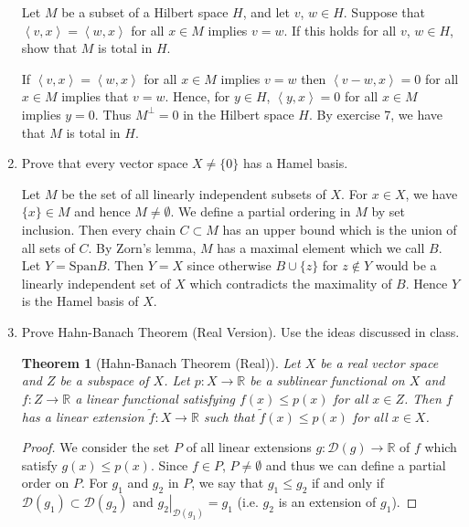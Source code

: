 \documentclass[12pt]{article}
\newtheorem{thm}[]{Theorem}
\newcommand{\mR}{\mathbb{R}}
\newcommand{\cD}{\mathcal{D}}
\newcommand{\inn}[2]{\left\langle #1, #2 \right\rangle}
\begin{document}
\begin{enumerate}
Let $M$ be a subset of a Hilbert space $H$, and
let $v$, $w\in H$. Suppose that $\inn{v}{x}=\inn{w}{x}$
for all $x\in M$ implies $v = w$. If this holds for all
$v$, $w\in H$, show that $M$ is total in $H$.
\begin{mybox}

    If $\inn{v}{x}=\inn{w}{x}$
    for all $x\in M$ implies $v = w$ then
    $\inn{v-w}{x}=0$ for all $x\in M$ implies that $v = w$.
    Hence, for $y\in H$, $\inn{y}{x}=0$
    for all $x\in M$ implies $y=0$. Thus $M^\perp =0$ in
    the Hilbert space $H$. By exercise 7, we have that $M$
    is total in $H$.
\end{mybox}

\item Prove that every vector space $X\neq \{0\}$
has a Hamel basis.
\begin{mybox}

    Let $M$ be the set of all linearly independent
    subsets of $X$. For $x\in X$, we have $\{x\}\in M$
    and hence $M\neq\emptyset$. We define a partial
    ordering in $M$ by set inclusion. Then every chain
    $C\subset M$ has an upper bound which is the union
    of all sets of $C$. By Zorn's lemma, $M$ has a maximal
    element which we call $B$. Let $Y=\text{Span} B$.
    Then $Y=X$ since otherwise $B\cup \{z\}$ for $z\notin
    Y$ would be a linearly independent set of $X$ which
    contradicts the maximality of $B$. Hence $Y$ is the
    Hamel basis of $X$.
\end{mybox}

\item Prove Hahn-Banach Theorem (Real Version). Use the
ideas discussed in class. 
\begin{mybox}

    \begin{thm}[Hahn-Banach Theorem (Real)]
        Let $X$ be a real vector space and $Z$ be a
        subspace of $X$. Let $p:X\longrightarrow \mR$ be
        a sublinear functional on $X$ and $f:Z
        \longrightarrow \mR$ a linear functional satisfying
        $f(x)\leq p(x)$ for all $x\in Z$. Then $f$ has a
        linear extension $\tilde{f}:X\longrightarrow\mR$
        such that $\tilde{f}(x)\leq p(x)$ for all
        $x\in X$.
    \end{thm}
    \begin{proof}
        We consider the set $P$ of all linear extensions
        $g:\cD(g)\longrightarrow\mR$ of $f$ which satisfy
        $g(x)\leq p(x)$. Since $f\in P$, $P\neq \emptyset$
        and thus we can define a partial order on $P$.
        For $g_1$ and $g_2$ in $P$, we say that
        $g_1\leq g_2$ if and only if $\cD(g_1)\subset
        \cD(g_2)$ and $\left. g_2\right|_{\cD(g_1)}=g_1$
        (i.e. $g_2$ is an extension of $g_1$).


\end{proof}
\end{mybox}
\end{enumerate}
\end{document}
